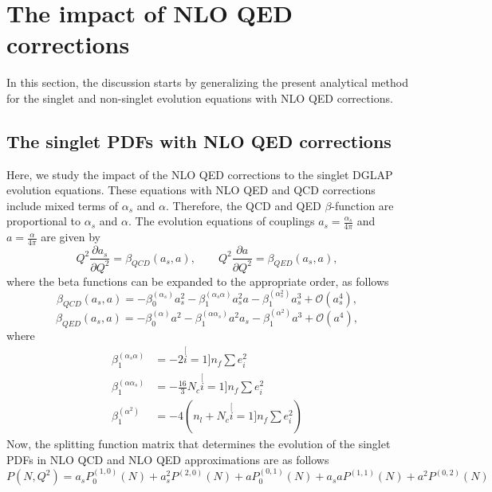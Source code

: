 \documentclass[review]{elsarticle}
\begin{document}
\section{The impact of NLO QED corrections}

In this section, the discussion starts by generalizing the present analytical method for the singlet and non-singlet evolution equations with NLO QED corrections. 

\subsection{The singlet PDFs with NLO QED corrections}

Here, we study the impact of the NLO QED corrections to the singlet DGLAP evolution equations. These equations with NLO QED and QCD corrections include mixed terms of $\alpha_s$ and $\alpha$. Therefore, the QCD and QED $\beta$-function are proportional to $\alpha_s$ and $\alpha$. The evolution equations of couplings $a_s=\frac{\alpha_s}{4 \pi}$ and $a=\frac{\alpha}{4 \pi}$ are given by
\[
Q^{2}\frac{\partial a_{s}}{\partial Q^{2}}=\beta_{QCD}(a_{s},a),\qquad Q^{2}\frac{\partial a}{\partial Q^{2}}=\beta_{QED}(a_{s},a),
\]
where the beta functions can be expanded to the appropriate order, as follows
\begin{equation}
\beta_{QCD}(a_{s},a)=-\beta_{0}^{(\alpha_s)}a_{s}^{2}-\beta_{1}^{(\alpha_s \alpha)}a_{s}^{2} a-\beta_{1}^{(\alpha_s^2)}a_{s}^{3}+\mathcal{O}(a_{s}^{4}),\label{eq:36}
\end{equation}
\begin{equation}
\beta_{QED}(a_{s},a)=-\beta_{0}^{(\alpha)}a^{2}-\beta_{1}^{(\alpha \alpha_s)}a^{2} a_s-\beta_{1}^{(\alpha^2)}a^{3}+\mathcal{O}(a^{4}),\label{eq:37}
\end{equation}
where
\begin{align*}
\beta_{1}^{(\alpha_{s}\alpha)} & =-2\stackrel[i=1]{n_{f}}{\sum}e_{i}^{2}\\
\beta_{1}^{(\alpha\alpha_{s})} & =-\frac{16}{3}N_{c}\stackrel[i=1]{n_{f}}{\sum}e_{i}^{2}\\
\beta_{1}^{(\alpha^{2})} & =-4(n_{l}+N_{c}\stackrel[i=1]{n_{f}}{\sum}e_{i}^{2})
\end{align*}
Now, the splitting function matrix that determines the evolution of the singlet PDFs in NLO QCD and NLO QED approximations are as follows
\begin{equation}
P(N,Q^{2})=a_{s}P_{0}^{(1,0)}(N)+a_{s}^{2}P^{(2,0)}(N)+a P_{0}^{(0,1)}(N)+a_{s} a P^{(1,1)}(N)+a^2 P^{(0,2)}(N)\label{eq:38}
\end{equation}
\end{document}
